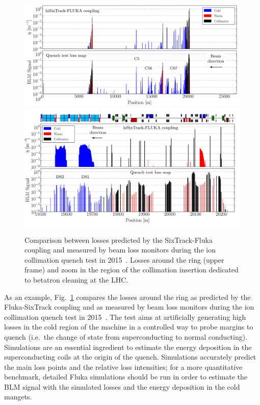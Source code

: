 \documentclass[a4paper,
              ]{jacow}
\begin{document}
\begin{figure}[!tbh]
\centering
 \includegraphics[width=\textwidth]{QT_LHC_mod.png}
 \includegraphics[width=\textwidth]{QT_IR7_mod.png}
 \caption{Comparison between losses predicted by the SixTrack-Fluka coupling and measured by beam loss monitors during the ion collimation quench test in 2015~\cite{PDHermes-PhD}. Losses around the ring (upper frame) and zoom in the region of the collimation insertion dedicated to betatron cleaning at the LHC.}
 \label{fig:QT_LMs}
\end{figure}
As an example, Fig.~\ref{fig:QT_LMs} compares the losses around the ring as predicted by the Fluka-SixTrack coupling and as measured by beam loss monitors during the ion collimation quench test in 2015~\cite{PDHermes-PhD}. The test aims at artificially generating high losses in the cold region of the machine in a controlled way to probe margins to quench (i.e.~the change of state from superconducting to normal conducting). Simulations are an essential ingredient to estimate the energy deposition in the superconducting coils at the origin of the quench. Simulations accurately predict the main loss points and the relative loss intensities; for a more quantitative benchmark, detailed Fluka simulations should be run in order to estimate the BLM signal with the simulated losses and the energy deposition in the cold mangets.
\end{document}

